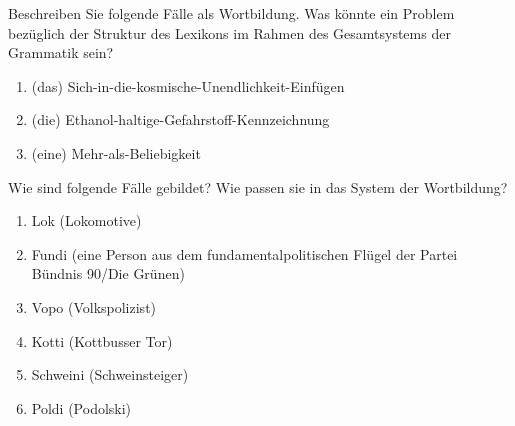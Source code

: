 \Uebung[\tristar] \label{u73} Beschreiben Sie folgende Fälle als Wortbildung.
Was könnte ein Problem bezüglich der Struktur des Lexikons im Rahmen des Gesamtsystems der Grammatik sein?

\begin{enumerate}\Lf
  \item (das) Sich-in-die-kosmische-Unendlichkeit-Einfügen
  \item (die) Ethanol-haltige-Gefahrstoff-Kennzeichnung
  \item (eine) Mehr-als-Beliebigkeit
\end{enumerate}

\Uebung[\tristar] \label{u74} Wie sind folgende Fälle gebildet?
Wie passen sie in das System der Wortbildung?

\begin{enumerate}\Lf
  \item Lok (Lokomotive)
  \item Fundi (eine Person aus dem fundamentalpolitischen Flügel der Partei Bündnis 90\slash Die Grünen)
  \item Vopo (Volkspolizist)
  \item Kotti (Kottbusser Tor)
  \item Schweini (Schweinsteiger)
  \item Poldi (Podolski)
\end{enumerate}

